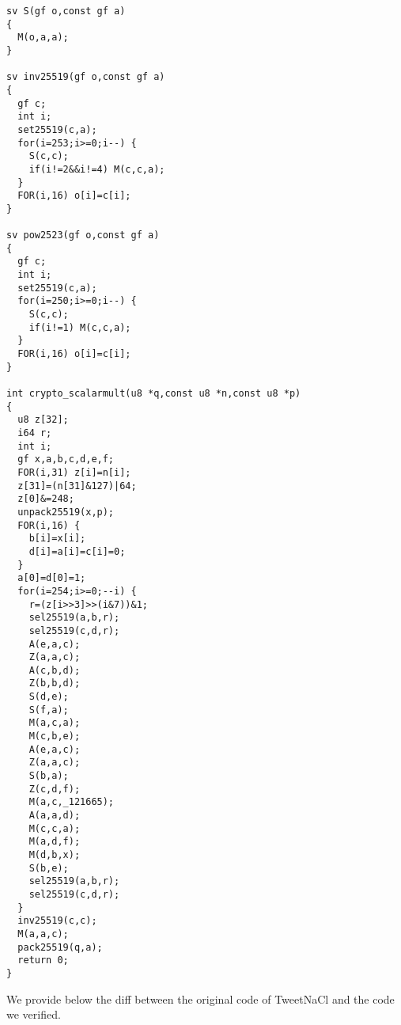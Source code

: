\begin{lstlisting}[language=Ctweetnacl]
sv S(gf o,const gf a)
{
  M(o,a,a);
}

sv inv25519(gf o,const gf a)
{
  gf c;
  int i;
  set25519(c,a);
  for(i=253;i>=0;i--) {
    S(c,c);
    if(i!=2&&i!=4) M(c,c,a);
  }
  FOR(i,16) o[i]=c[i];
}

sv pow2523(gf o,const gf a)
{
  gf c;
  int i;
  set25519(c,a);
  for(i=250;i>=0;i--) {
    S(c,c);
    if(i!=1) M(c,c,a);
  }
  FOR(i,16) o[i]=c[i];
}

int crypto_scalarmult(u8 *q,const u8 *n,const u8 *p)
{
  u8 z[32];
  i64 r;
  int i;
  gf x,a,b,c,d,e,f;
  FOR(i,31) z[i]=n[i];
  z[31]=(n[31]&127)|64;
  z[0]&=248;
  unpack25519(x,p);
  FOR(i,16) {
    b[i]=x[i];
    d[i]=a[i]=c[i]=0;
  }
  a[0]=d[0]=1;
  for(i=254;i>=0;--i) {
    r=(z[i>>3]>>(i&7))&1;
    sel25519(a,b,r);
    sel25519(c,d,r);
    A(e,a,c);
    Z(a,a,c);
    A(c,b,d);
    Z(b,b,d);
    S(d,e);
    S(f,a);
    M(a,c,a);
    M(c,b,e);
    A(e,a,c);
    Z(a,a,c);
    S(b,a);
    Z(c,d,f);
    M(a,c,_121665);
    A(a,a,d);
    M(c,c,a);
    M(a,d,f);
    M(d,b,x);
    S(b,e);
    sel25519(a,b,r);
    sel25519(c,d,r);
  }
  inv25519(c,c);
  M(a,a,c);
  pack25519(q,a);
  return 0;
}
\end{lstlisting}

 We provide below the diff between the original code of TweetNaCl and the code we verified.


